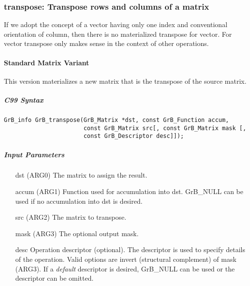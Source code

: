 
\subsubsection{{\sf transpose}: Transpose rows and columns of a matrix}

{\scott If we adopt the concept of a vector having only one index and conventional orientation of column, then there is no materialized transpose for vector. For vector transpose only makes sense in the context of other operations.}

\paragraph{Standard Matrix Variant}

This version materializes a new matrix that is the transpose of the source matrix.

\subparagraph{C99 Syntax}

\begin{verbatim}
GrB_info GrB_transpose(GrB_Matrix *dst, const GrB_Function accum,
                       const GrB_Matrix src[, const GrB_Matrix mask [,
                       const GrB_Descriptor desc]]);
\end{verbatim}

\subparagraph{Input Parameters}

\begin{itemize}
	\item[{\sf dst}]   ({\sf ARG0}) The matrix to assign the result.
	\item[{\sf accum}] ({\sf ARG1}) Function used for accumulation into dst.  {\sf GrB\_NULL}
                       can be used if no accumulation into dst is desired.
	\item[{\sf src}]   ({\sf ARG2}) The matrix to transpose.
    \item[{\sf mask}]  ({\sf ARG3}) The optional output mask.

	\item[{\sf desc}]  Operation descriptor (optional). The descriptor
    is used to specify details of the operation. Valid options are 
    invert (structural complement) of mask ({\sf ARG3}). If
    a \emph{default} descriptor is desired,	{\sf GrB\_NULL} can be
    used or the descriptor can be omitted.
\end{itemize}

